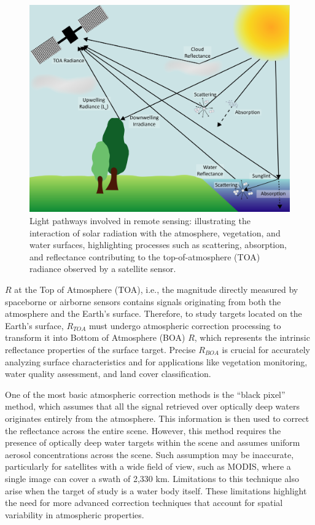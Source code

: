 \documentclass[
  letterpaper,
  11pt,
  english,
  singlespacing,
  headsepline]{MastersDoctoralThesis}
\begin{document}
\begin{spacing}{1.5}
\begin{figure}
{\includegraphics[width=0.9\linewidth,height=\textheight,keepaspectratio]{Chapter1/Figs/FigLightPath.png}

}

\caption{\label{fig-FigLightPath}Light pathways involved in remote
sensing: illustrating the interaction of solar radiation with the
atmosphere, vegetation, and water surfaces, highlighting processes such
as scattering, absorption, and reflectance contributing to the
top-of-atmosphere (TOA) radiance observed by a satellite sensor.}

\end{figure}%

\(R\) at the Top of Atmosphere (TOA), i.e., the magnitude directly
measured by spaceborne or airborne sensors contains signals originating
from both the atmosphere and the Earth's surface. Therefore, to study
targets located on the Earth's surface, \(R_{TOA}\) must undergo
atmospheric correction processing to transform it into Bottom of
Atmosphere (BOA) \(R\), which represents the intrinsic reflectance
properties of the surface target. Precise \(R_{BOA}\) is crucial for
accurately analyzing surface characteristics and for applications like
vegetation monitoring, water quality assessment, and land cover
classification.

One of the most basic atmospheric correction methods is the ``black
pixel'' method, which assumes that all the signal retrieved over
optically deep waters originates entirely from the atmosphere. This
information is then used to correct the reflectance across the entire
scene. However, this method requires the presence of optically deep
water targets within the scene and assumes uniform aerosol
concentrations across the scene. Such assumption may be inaccurate,
particularly for satellites with a wide field of view, such as MODIS,
where a single image can cover a swath of 2,330 km. Limitations to this
technique also arise when the target of study is a water body itself.
These limitations highlight the need for more advanced correction
techniques that account for spatial variability in atmospheric
properties.


\end{spacing}
\end{document}
